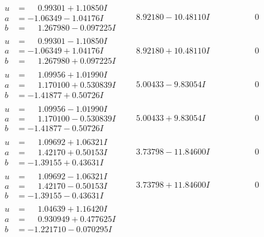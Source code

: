 \documentclass[1p]{elsarticle_modified}
\theoremstyle{definition}
\begin{document}
$$\begin{array}{c|c|c}
\begin{aligned}
u &= \phantom{-}0.99301 + 1.10850 I \\
a &= -1.06349 - 1.04176 I \\
b &= \phantom{-}1.267980 - 0.097225 I\end{aligned}
 & \phantom{-}8.92180 - 10.48110 I & \phantom{-0.000000 } 0 \\ \hline\begin{aligned}
u &= \phantom{-}0.99301 - 1.10850 I \\
a &= -1.06349 + 1.04176 I \\
b &= \phantom{-}1.267980 + 0.097225 I\end{aligned}
 & \phantom{-}8.92180 + 10.48110 I & \phantom{-0.000000 } 0 \\ \hline\begin{aligned}
u &= \phantom{-}1.09956 + 1.01990 I \\
a &= \phantom{-}1.170100 + 0.530839 I \\
b &= -1.41877 + 0.50726 I\end{aligned}
 & \phantom{-}5.00433 - 9.83054 I & \phantom{-0.000000 } 0 \\ \hline\begin{aligned}
u &= \phantom{-}1.09956 - 1.01990 I \\
a &= \phantom{-}1.170100 - 0.530839 I \\
b &= -1.41877 - 0.50726 I\end{aligned}
 & \phantom{-}5.00433 + 9.83054 I & \phantom{-0.000000 } 0 \\ \hline\begin{aligned}
u &= \phantom{-}1.09692 + 1.06321 I \\
a &= \phantom{-}1.42170 + 0.50153 I \\
b &= -1.39155 + 0.43631 I\end{aligned}
 & \phantom{-}3.73798 - 11.84600 I & \phantom{-0.000000 } 0 \\ \hline\begin{aligned}
u &= \phantom{-}1.09692 - 1.06321 I \\
a &= \phantom{-}1.42170 - 0.50153 I \\
b &= -1.39155 - 0.43631 I\end{aligned}
 & \phantom{-}3.73798 + 11.84600 I & \phantom{-0.000000 } 0 \\ \hline\begin{aligned}
u &= \phantom{-}1.04639 + 1.16420 I \\
a &= \phantom{-}0.930949 + 0.477625 I \\
b &= -1.221710 - 0.070295 I\end{aligned}

\end{array}$$
\end{document}
